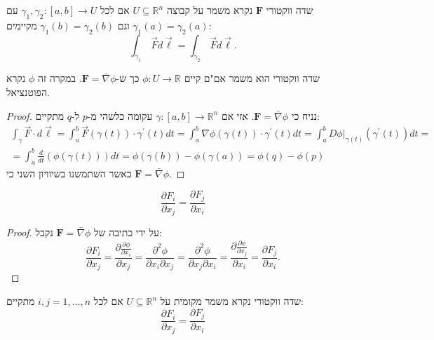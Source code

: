 \documentclass{tstextbook}
\begin{document}
\begin{definition}
שדה ווקטורי \(\mathbf{F}\) נקרא משמר על קבוצה \(U\subseteq \mathbb{R}^{n}\) אם לכל \(\gamma_{1},\gamma_{2}:[a,b]\to U\) עם \(\gamma_{1}(a)=\gamma_{2}(a)\) וגם \(\gamma_{1}(b)=\gamma_{2}(b)\) מקיימים:
$$\int_{\gamma_{1}}\,\vec{F}d\vec{\ell}=\int_{\gamma_{2}}\,\vec{F}d\vec{\ell}.$$

\end{definition}
\begin{proposition}
שדה ווקטורי הוא משמר אם"ם קיים \(\phi:U\to \mathbb{R}\) כך ש-\(\mathbf{F}=\bar{\nabla}\phi\). במקרה זה \(\phi\) נקרא הפוטנציאל.

\end{proposition}
\begin{proof}
נניח כי \(\mathbf{F}=\bar{\nabla}\phi\). אזי אם \(\gamma:[a,b]\to \mathbb{R}^{n}\) עקומה כלשהי מ-\(p\) ל-\(q\) מתקיים:
\begin{gather*}\int_{\gamma}{\vec{F}}\cdot d{\vec{\ell}}=\int_{a}^{b}{\vec{F}}(\gamma(t))\cdot\gamma^{\prime}(t)d t=\int_{a}^{b}\nabla\phi(\gamma(t))\cdot\gamma^{\prime}(t)d t=\int_{a}^{b}D\phi|_{\gamma(t)}\left(\gamma^{\prime}(t)\right)d t= \\=\int_{a}^{b}{\frac{d}{d t}}\left(\phi(\gamma(t))\right)d t=\phi(\gamma(b))-\phi(\gamma(a))=\phi(q)-\phi(p)
\end{gather*}
כאשר השתמשנו בשיוויון השני כי \(\mathbf{F}=\bar{\nabla}\phi\).

\end{proof}
\begin{proposition}[אם \(\mathbf{F}=(F_{1},\dots,F_{n})\) שדה משמר על \(U\subseteq \mathbb{R}^{n}\) אזי לכל \(i,j = 1,\dots,n\) מתקיים:]
$$\frac{\partial F_{i}}{\partial x_{j}} =\frac{\partial F_{j}}{\partial x_{i}} $$

\end{proposition}
\begin{proof}
על ידי כתיבה של \(\mathbf{F}=\bar{\nabla}\phi\) נקבל:
$${\frac{\partial F_{i}}{\partial x_{j}}}={\frac{\partial{\frac{\partial\phi}{\partial x_{i}}}}{\partial x_{j}}}={\frac{\partial^{2}\phi}{\partial x_{i}\partial x_{j}}}={\frac{\partial^{2}\phi}{\partial x_{j}\partial x_{i}}}={\frac{\partial{\frac{\partial\phi}{\partial x_{j}}}}{\partial x_{i}}}={\frac{\partial F_{j}}{\partial x_{i}}}.$$

\end{proof}
\begin{definition}
שדה ווקטורי נקרא משמר מקומית על \(U\subseteq \mathbb{R}^{n}\) אם לכל \(i,j = 1,\dots,n\) מתקיים:
$$\frac{\partial F_{i}}{\partial x_{j}} =\frac{\partial F_{j}}{\partial x_{i}} $$

\end{definition}
\end{document}
